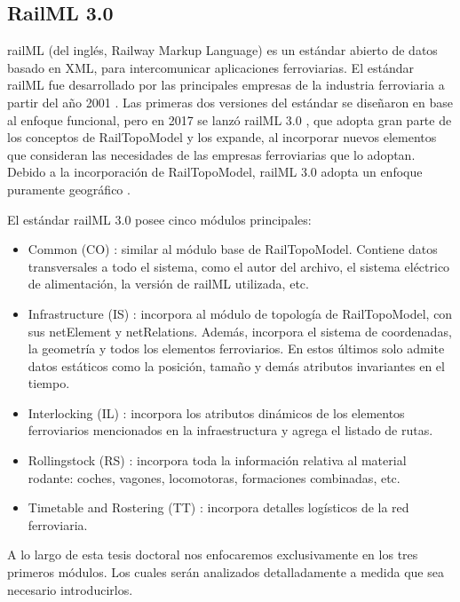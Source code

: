 \subsection{RailML 3.0}

	railML \cite{RAILML_0,Paper_107,Paper_112,Paper_150,Paper_159} (del inglés, Railway Markup Language) es un estándar abierto de datos basado en XML, para intercomunicar aplicaciones ferroviarias. El estándar railML fue desarrollado por las principales empresas de la industria ferroviaria a partir del año 2001 \cite{Paper_159}. Las primeras dos versiones del estándar se diseñaron en base al enfoque funcional, pero en 2017 se lanzó railML 3.0 \cite{RAILML_0,Paper_146,Paper_150}, que adopta gran parte de los conceptos de RailTopoModel y los expande, al incorporar nuevos elementos que consideran las necesidades de las empresas ferroviarias que lo adoptan. Debido a la incorporación de RailTopoModel, railML 3.0 adopta un enfoque puramente geográfico \cite{Paper_150}.
	
	El estándar railML 3.0 posee cinco módulos principales:
	

    \begin{itemize}
        \item Common (CO) \cite{RAILML_CO}: similar al módulo base de RailTopoModel. Contiene datos transversales a todo el sistema, como el autor del archivo, el sistema eléctrico de alimentación, la versión de railML utilizada, etc.
        \item Infrastructure (IS) \cite{RAILML_IS}: incorpora al módulo de topología de RailTopoModel, con sus netElement y netRelations. Además, incorpora el sistema de coordenadas, la geometría y todos los elementos ferroviarios. En estos últimos solo admite datos estáticos como la posición, tamaño y demás atributos invariantes en el tiempo.
        \item Interlocking (IL) \cite{RAILML_IL}: incorpora los atributos dinámicos de los elementos ferroviarios mencionados en la infraestructura y agrega el listado de rutas.
        \item Rollingstock (RS) \cite{RAILML_RS}: incorpora toda la información relativa al material rodante: coches, vagones, locomotoras, formaciones combinadas, etc.
        \item Timetable and Rostering (TT) \cite{RAILML_TT}: incorpora detalles logísticos de la red ferroviaria.
    \end{itemize}

    A lo largo de esta tesis doctoral nos enfocaremos exclusivamente en los tres primeros módulos. Los cuales serán analizados detalladamente a medida que sea necesario introducirlos.